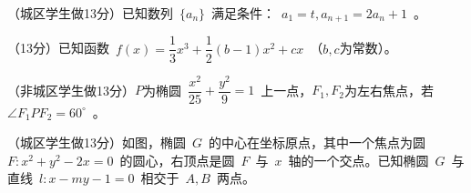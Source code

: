 \documentclass{BHCexam}
\begin{document}
\begin{questions}
（城区学生做13分）已知数列~$\{a_n \}$~满足条件：~$a_1=t,a_{n+1}=2a_n+1$~。
\vspace{8cm}
\qs （13分）已知函数~$f(x)=\dfrac{1}{3} x^3+\dfrac{1}{2} (b-1)x^2+cx$~（$b,c$为常数）。
\newpage
\qs （非城区学生做13分）$P$为椭圆~$\dfrac{x^2}{25}+\dfrac{y^2}{9}=1$~上一点，$F_1,F_2$为左右焦点，若~$\angle F_1PF_2=60^{\circ}$~。
（城区学生做13分）如图，椭圆~$G$~的中心在坐标原点，其中一个焦点为圆~$F:x^2+y^2-2x=0$~的圆心，右顶点是圆~$F$~与~$x$~轴的一个交点。已知椭圆~$G$~与直线~$l:x-my-1=0$~相交于~$A,B$~两点。
\begin{parts}

\end{parts}
\end{questions}
\end{document}
